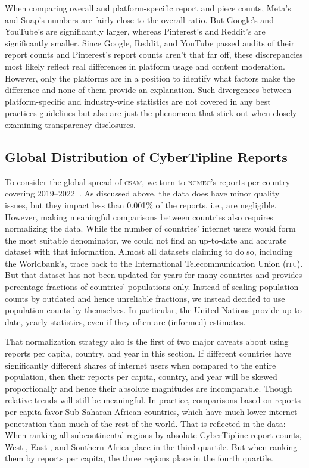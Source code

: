 \documentclass[nonacm,screen]{acmart}
\newcommand\V[1]{\textsc{\MakeLowercase{#1}}}
\begin{document}
\begin{itemize}
{When comparing overall and platform-specific report and piece counts, Meta's and
Snap's numbers are fairly close to the overall ratio. But Google's and YouTube's
are significantly larger, whereas Pinterest's and Reddit's are significantly
smaller. Since Google, Reddit, and YouTube passed audits of their report counts
and Pinterest's report counts aren't that far off, these discrepancies most
likely reflect real differences in platform usage and content moderation.
However, only the platforms are in a position to identify what factors make the
difference and none of them provide an explanation. Such divergences between
platform-specific and industry-wide statistics are not covered in any best
practices guidelines but also are just the phenomena that stick out when closely
examining transparency disclosures.


\subsection{Global Distribution of CyberTipline Reports}
\label{sec:spread}

To consider the global spread of \V{CSAM}, we turn to \V{NCMEC}'s reports per
country covering 2019--2022~\cite{NcmecByCountry2019,NcmecByCountry2020,
NcmecByCountry2021,NcmecByCountry2020}. As discussed above, the data does have
minor quality issues, but they impact less than 0.001\% of the reports, i.e.,
are negligible. However, making meaningful comparisons between countries also
requires normalizing the data. While the number of countries' internet users
would form the most suitable denominator, we could not find an up-to-date and
accurate dataset with that information. Almost all datasets claiming to do so,
including the Worldbank's, trace back to the International Telecommunication
Union (\V{ITU}). But that dataset has not been updated for years for many
countries and provides percentage fractions of countries' populations only.
Instead of scaling population counts by outdated and hence unreliable fractions,
we instead decided to use population counts by themselves. In particular, the
United Nations provide up-to-date, yearly statistics, even if they often are
(informed) estimates.

That normalization strategy also is the first of two major caveats about using
reports per capita, country, and year in this section. If different countries
have significantly different shares of internet users when compared to the
entire population, then their reports per capita, country, and year will be
skewed proportionally and hence their absolute magnitudes are incomparable.
Though relative trends will still be meaningful. In practice, comparisons based
on reports per capita favor Sub-Saharan African countries, which have much lower
internet penetration than much of the rest of the world. That is reflected in
the data: When ranking all subcontinental regions by absolute CyberTipline
report counts, West-, East-, and Southern Africa place in the third quartile.
But when ranking them by reports per capita, the three regions place in the
fourth quartile.

}
\end{itemize}
\end{document}
